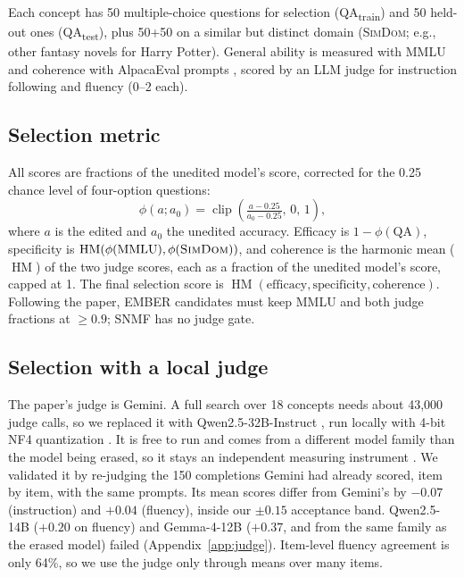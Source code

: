 \documentclass[11pt]{article}
\newcommand{\qatrain}{\textsc{QA}\textsubscript{train}}
\newcommand{\qatest}{\textsc{QA}\textsubscript{test}}
\newcommand{\hm}{\operatorname{HM}}
\begin{document}
Each concept has 50 multiple-choice questions for selection (\qatrain) and 50 held-out ones (\qatest), plus 50+50 on a similar but distinct domain (\textsc{SimDom}; e.g., other fantasy novels for Harry Potter).
General ability is measured with MMLU \citep{hendrycks2021mmlu} and coherence with AlpacaEval prompts \citep{taori2023alpaca}, scored by an LLM judge for instruction following and fluency (0--2 each).

\subsection{Selection metric}
All scores are fractions of the unedited model's score, corrected for the 0.25 chance level of four-option questions:
\begin{equation}
  \phi(a; a_0) = \operatorname{clip}\!\left(\tfrac{a - 0.25}{a_0 - 0.25},\,0,\,1\right),
\end{equation}
where $a$ is the edited and $a_0$ the unedited accuracy.
Efficacy is $1 - \phi(\text{QA})$, specificity is $\hm(\phi(\text{MMLU}), \phi(\textsc{SimDom}))$, and coherence is the harmonic mean ($\hm$) of the two judge scores, each as a fraction of the unedited model's score, capped at 1.
The final selection score is $\hm(\text{efficacy}, \text{specificity}, \text{coherence})$.
Following the paper, EMBER candidates must keep MMLU and both judge fractions at $\geq 0.9$; SNMF has no judge gate.

\subsection{Selection with a local judge}
The paper's judge is Gemini.
A full search over 18 concepts needs about 43{,}000 judge calls, so we replaced it with Qwen2.5-32B-Instruct \citep{qwen2024qwen25}, run locally with 4-bit NF4 quantization \citep{dettmers2023qlora}.
It is free to run and comes from a different model family than the model being erased, so it stays an independent measuring instrument \citep[cf.][]{zheng2023judging}.
We validated it by re-judging the 150 completions Gemini had already scored, item by item, with the same prompts.
Its mean scores differ from Gemini's by $-0.07$ (instruction) and $+0.04$ (fluency), inside our $\pm 0.15$ acceptance band.
Qwen2.5-14B ($+0.20$ on fluency) and Gemma-4-12B ($+0.37$, and from the same family as the erased model) failed (Appendix~\ref{app:judge}).
Item-level fluency agreement is only 64\%, so we use the judge only through means over many items.
\end{document}

